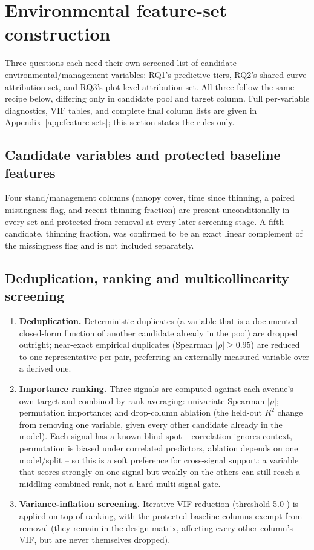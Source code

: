 \section{Environmental feature-set construction}
\label{sec:feature-sets}

Three questions each need their own screened list of candidate environmental/management
variables: RQ1's predictive tiers, RQ2's shared-curve attribution set, and RQ3's plot-level
attribution set. All three follow the same recipe below, differing only in candidate pool and
target column. Full per-variable diagnostics, VIF tables, and complete final column lists are
given in Appendix~\ref{app:feature-sets}; this section states the rules only.

\subsection{Candidate variables and protected baseline features}
\label{sec:feature-baseline}

Four stand/management columns (canopy cover, time since thinning, a paired missingness flag, and
recent-thinning fraction) are present unconditionally in every set and protected from removal at
every later screening stage. A fifth candidate, thinning fraction, was confirmed to be an exact
linear complement of the missingness flag and is not included separately.

\subsection{Deduplication, ranking and multicollinearity screening}
\label{sec:feature-screening}

\begin{enumerate}
\setlength\itemsep{0pt}
\item \textbf{Deduplication.} Deterministic duplicates (a variable that is a documented closed-form
  function of another candidate already in the pool) are dropped outright; near-exact empirical
  duplicates (Spearman $|\rho|\geq0.95$) are reduced to one representative per pair, preferring an
  externally measured variable over a derived one.
\item \textbf{Importance ranking.} Three signals are computed against each avenue's own target and
  combined by rank-averaging: univariate Spearman $|\rho|$; permutation importance; and
  drop-column ablation (the held-out $R^2$ change from removing one variable, given every other
  candidate already in the model). Each signal has a known blind spot -- correlation ignores
  context, permutation is biased under correlated predictors, ablation depends on one model/split
  -- so this is a soft preference for cross-signal support: a variable that scores strongly on one
  signal but weakly on the others can still reach a middling combined rank, not a hard
  multi-signal gate.
\item \textbf{Variance-inflation screening.} Iterative VIF reduction (threshold 5.0
  \citep{dormann2013}) is applied on top of ranking, with the protected baseline columns exempt
  from removal (they remain in the design matrix, affecting every other column's VIF, but are
  never themselves dropped).
\end{enumerate}

